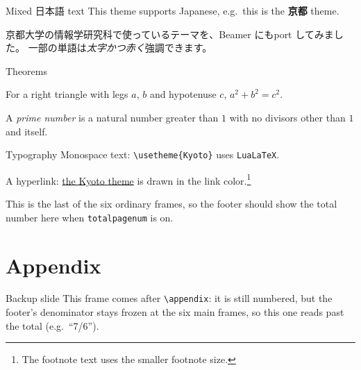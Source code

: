 \documentclass[aspectratio=169]{beamer}
\begin{document}
\begin{frame}{Mixed 日本語 text}
  This theme supports Japanese, e.g.\ this is the {\bfseries 京都} theme.

  \medskip
  京都大学の情報学研究科で使っているテーマを、Beamer にもport してみました。
  一部の単語は\emph{太字かつ赤く}強調できます。
\end{frame}

\begin{frame}{Theorems}
  \begin{theorem}
    For a right triangle with legs $a$, $b$ and hypotenuse $c$,
    $a^2 + b^2 = c^2$.
  \end{theorem}

  \begin{definition}
    A \emph{prime number} is a natural number greater than $1$ with no
    divisors other than $1$ and itself.
  \end{definition}
\end{frame}

\begin{frame}{Typography}
  Monospace text: \texttt{\textbackslash usetheme\{Kyoto\}} uses
  \texttt{LuaLaTeX}.

  \medskip
  A hyperlink: \href{https://github.com/MasWag/beamer-theme-kyoto}{the
  Kyoto theme} is drawn in the link color.\footnote{The footnote text
  uses the smaller footnote size.}

  \medskip
  This is the last of the six ordinary frames, so the footer should
  show the total number here when \texttt{totalpagenum} is on.
\end{frame}

\appendix

\section{Appendix}
\begin{frame}[noframenumbering]
  \sectionpage
\end{frame}

\begin{frame}{Backup slide}
  This frame comes after \texttt{\textbackslash appendix}: it is still
  numbered, but the footer's denominator stays frozen at the six main
  frames, so this one reads past the total (e.g.\ ``7/6'').
\end{frame}
\end{document}
